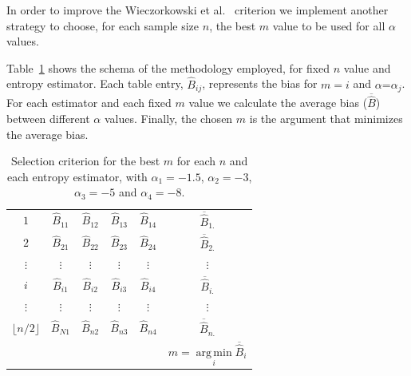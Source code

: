 \documentclass[journal]{IEEEtran}
\DeclareMathOperator*{\argmin}{arg\,min}
\begin{document}
In order to improve the Wieczorkowski et al.~\cite{Wieczorkowski1999} criterion we implement another strategy to choose, for each sample size $n$, the best $m$ value to be used for all $\alpha$ values.

Table~\ref{tab:eleccion_mejor_m} shows the schema of the methodology employed, for fixed $n$ value and entropy estimator. 
Each table entry, $\widehat{B}_{ij}$, represents the bias for $m=i$ and $\alpha \text{=} \alpha_j$. 
For each estimator and each fixed $m$ value we calculate the average bias ($\overline{\widehat{B}}$) between different $\alpha$ values. Finally, the chosen $m$ is the argument that minimizes the average bias.

\begin{table}[hbt]
	\caption{Selection criterion for the best $m$ for each $n$ and each entropy estimator, with $\alpha_1= -1.5$, $\alpha_2=-3$, $\alpha_3=-5$ and $\alpha_4=-8$.}
	\label{tab:eleccion_mejor_m}
	\centering
	\begin{tabular}{c c c c c c}
		\toprule
		\boldmath{$m$}	& \boldmath{$\alpha_{1}$} & \boldmath{$\alpha_{2}$}
		& \boldmath{$\alpha_{3}$}
		& \boldmath{$\alpha_{4}$} & \boldmath{$\overline{\widehat{B}}$} \\
		
		\midrule
		$1$	& $\widehat{B}_{11}$ & $\widehat{B}_{12}$ & $\widehat{B}_{13}$ & $\widehat{B}_{14}$ & $\overline{\widehat{B}}_{1.}$\\
		
		$2$	& $\widehat{B}_{21}$ & $\widehat{B}_{22}$ & $\widehat{B}_{23}$ & $\widehat{B}_{24}$ & $\overline{\widehat{B}}_{2.}$\\
		$\vdots$ & $\vdots$ & $\vdots$ & $\vdots$ & $\vdots$ & $\vdots$ \\
		
		$i$ & $\widehat{B}_{i1}$ & $\widehat{B}_{i2}$ & $\widehat{B}_{i3}$ & $\widehat{B}_{i4}$ & $\overline{\widehat{B}}_{i.}$\\
		$\vdots$ & $\vdots$ & $\vdots$ & $\vdots$ & $\vdots$ & $\vdots$\\
		
		$\lfloor n/2 \rfloor$ & $\widehat{B}_{N1}$ & $\widehat{B}_{n2}$ & $\widehat{B}_{n3}$ & $\widehat{B}_{n4}$ & $\overline{\widehat{B}}_{n.}$\\
		\bottomrule
		& & & & & $m=\argmin\limits_{i} \overline{\widehat{B}}_{i}$\\
		
		\bottomrule
	\end{tabular}
\end{table}	
\end{document}
